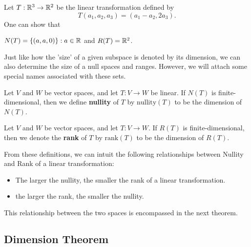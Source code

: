 \begin{eg}\label{Example 9}
    Let \( T: \mathbb{R}^{3} \to \mathbb{R}^{2}  \) be the linear transformation defined by 
    \[  T(a_{1}, a_{2}, a_{3}) = (a_{1} - a_{2}, 2a_{3}). \]
    One can show that 
    \begin{center}
        \( N(T) = \{ (a, a, 0) \}: a \in \mathbb{R}   \) and \( R(T) = \mathbb{R}^{2} \).
    \end{center}
\end{eg}



Just like how the 'size' of a given subspace is denoted by its dimension, we can also determine the size of a null spaces and ranges. However, we will attach some special names associated with these sets.
\begin{definition}[Nullity]\label{Nullity}
    Let \( V  \) and \( W  \) be vector spaces, and let \( T: V \to W  \) be linear. If \( N(T)  \) is finite-dimensional, then we define \textbf{nullity} of \( T  \) by \( \text{nullity}(T)  \) to be the dimension of \( N(T) \).
\end{definition}

\begin{definition}[Rank]\label{Rank}
    Let \( V  \) and \( W  \) be vector spaces, and let \( T: V \to W  \). If \( R(T)  \) is finite-dimensional, then we denote the \textbf{rank} of \( T  \) by \( \text{rank}(T) \) to be the dimension of \( R(T) \). 
\end{definition}

From these definitions, we can intuit the following relationships between Nullity and Rank of a linear transformation:
\begin{itemize}
    \item The larger the nullity, the smaller the rank of a linear transformation.
    \item the larger the rank, the smaller the nullity.
\end{itemize}
This relationship between the two spaces is encompassed in the next theorem.

\subsection{Dimension Theorem}


